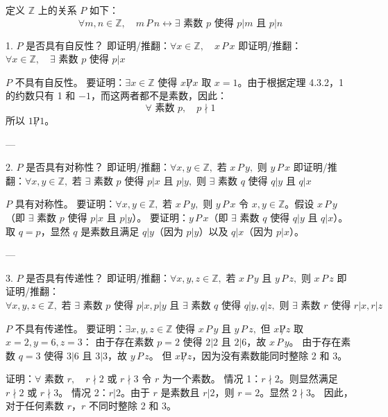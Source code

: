 \begin{questions}
\question 
定义 $\mathbb{Z}$ 上的关系 $P$ 如下：
\[ \forall m, n \in \mathbb{Z}, \quad m \, P \, n \leftrightarrow \exists \text{ 素数 } p \text{ 使得 } p|m \text{ 且 } p|n \]

\begin{solution}
1. $P$ 是否具有自反性？
即证明/推翻：$\forall x \in \mathbb{Z}, \quad x \, P \, x$
即证明/推翻：$\forall x \in \mathbb{Z}, \quad \exists \text{ 素数 } p \text{ 使得 } p|x$

$P$ 不具有自反性。
要证明：$\exists x \in \mathbb{Z} \text{ 使得 } x \not P x$
取 $x = 1$。由于根据定理 4.3.2，1 的约数只有 1 和 $-1$，而这两者都不是素数，因此：
\[ \forall \text{ 素数 } p, \quad p \nmid 1 \]
所以 $1 \not P 1$。

---

2. $P$ 是否具有对称性？
即证明/推翻：$\forall x, y \in \mathbb{Z}, \text{ 若 } x \, P \, y, \text{ 则 } y \, P \, x$
即证明/推翻：$\forall x, y \in \mathbb{Z}, \text{ 若 } \exists \text{ 素数 } p \text{ 使得 } p|x \text{ 且 } p|y, \text{ 则 } \exists \text{ 素数 } q \text{ 使得 } q|y \text{ 且 } q|x$

$P$ 具有对称性。
要证明：$\forall x, y \in \mathbb{Z}, \text{ 若 } x \, P \, y, \text{ 则 } y \, P \, x$
令 $x, y \in \mathbb{Z}$。假设 $x \, P \, y$（即 $\exists \text{ 素数 } p \text{ 使得 } p|x \text{ 且 } p|y$）。
要证明：$y \, P \, x$（即 $\exists \text{ 素数 } q \text{ 使得 } q|y \text{ 且 } q|x$）。
取 $q = p$，显然 $q$ 是素数且满足 $q|y$（因为 $p|y$）以及 $q|x$（因为 $p|x$）。

---

3. $P$ 是否具有传递性？
即证明/推翻：$\forall x, y, z \in \mathbb{Z}, \text{ 若 } x \, P \, y \text{ 且 } y \, P \, z, \text{ 则 } x \, P \, z$
即证明/推翻：$\forall x, y, z \in \mathbb{Z}, \text{ 若 } \exists \text{ 素数 } p \text{ 使得 } p|x, p|y \text{ 且 } \exists \text{ 素数 } q \text{ 使得 } q|y, q|z, \text{ 则 } \exists \text{ 素数 } r \text{ 使得 } r|x, r|z$

$P$ 不具有传递性。
要证明：$\exists x, y, z \in \mathbb{Z} \text{ 使得 } x \, P \, y \text{ 且 } y \, P \, z, \text{ 但 } x \not P z$
取 $x = 2, y = 6, z = 3$：
由于存在素数 $p = 2$ 使得 $2|2$ 且 $2|6$，故 $x \, P \, y$。
由于存在素数 $q = 3$ 使得 $3|6$ 且 $3|3$，故 $y \, P \, z$。
但 $x \not P z$，因为没有素数能同时整除 2 和 3。

证明：$\forall \text{ 素数 } r, \quad r \nmid 2 \text{ 或 } r \nmid 3$
令 $r$ 为一个素数。
情况 1：$r \nmid 2$。则显然满足 $r \nmid 2$ 或 $r \nmid 3$。
情况 2：$r | 2$。由于 $r$ 是素数且 $r|2$，则 $r = 2$。显然 $2 \nmid 3$。
因此，对于任何素数 $r$，$r$ 不同时整除 2 和 3。
\end{solution}


\end{questions}
